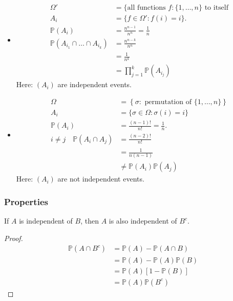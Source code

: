 \begin{example}[Independence] ~\vspace*{-1.5\baselineskip} \label{exm:indep1}
    \begin{itemize}
        \item \begin{align*}
            \Omega' &= \{\text{all functions } f : \{1, \dots, n\} \text{ to itself} \\
            A_i &= \{f \in \Omega' : f(i) = i\}. \\
            \mathbb{P}(A_i) &= \frac{n^{n -1}}{n^n} = \frac{1}{n} \\
            \mathbb{P}(A_{i_1} \cap \dots \cap A_{i_k}) &= \frac{n^{n -k}}{n^n} \\
            &= \frac{1}{n^k} \\
            &= \prod_{j = 1}^k \mathbb{P}(A_{i_j})
        \end{align*} 
        Here: $(A_i)$ are independent events.
        \item \begin{align*}
            \Omega &= \left\{\sigma : \text{ permutation of } \{1, \dots, n\} \right\} \\
            A_i &= \{ \sigma \in \Omega : \sigma(i) = i \} \\
            \mathbb{P}(A_i) &= \frac{(n - 1)!}{n!} = \frac{1}{n}. \\
            i \neq j \quad \mathbb{P}(A_i \cap A_j) &= \frac{(n - 2)!}{n!} \\
            &= \frac{1}{n(n - 1)} \\
            &\neq \mathbb{P}(A_i) \mathbb{P}(A_j)
        \end{align*} 
        Here: $(A_i)$ are not independent events.
    \end{itemize} 
\end{example} 

\subsubsection{Properties}
\begin{claim}
    If $A$ is independent of $B$, then $A$ is also independent of $B^c$.
\end{claim} 

\begin{proof}
    \begin{align*}
        \mathbb{P}(A \cap B^c) &= \mathbb{P}(A) - \mathbb{P}(A \cap B) \\
        &= \mathbb{P}(A) - \mathbb{P}(A)\mathbb{P}(B) \\
        &= \mathbb{P}(A) [1 - \mathbb{P}(B)] \\
        &= \mathbb{P}(A) \mathbb{P}(B^c)
    \end{align*}  
\end{proof} 

